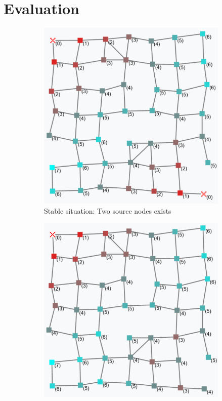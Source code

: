 \documentclass[conference]{IEEEtran}
\begin{document}
\section{Evaluation}
\begin{figure}[h]
  \centering
  \begin{subfigure}[b]{0.32\textwidth}
      \centering
      \includegraphics[width=\textwidth]{img/hop-count-1.png}
      \caption{Stable situation: Two source nodes exists}
  \end{subfigure}
  \hfill
  \begin{subfigure}[b]{0.32\textwidth}
      \centering
      \includegraphics[width=\textwidth]{img/hop-count-2.png}

\end{subfigure}
\end{figure}
\end{document}
